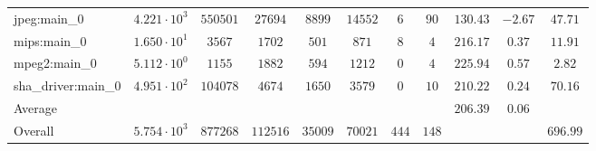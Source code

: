 \begin{tabular}{|l|c|c|c|c|c|c|c|c|c|c|}
jpeg:main\_0            & $ 4.221 \cdot 10^{3}  $ & $ 550501 $ & $ 27694  $ & $ 8899  $ & $ 14552 $ & $ 6   $ & $ 90  $ & $ 130.43      $ & $ -2.67   $ & $ 47.71   $ \\
mips:main\_0            & $ 1.650 \cdot 10^{1}  $ & $ 3567   $ & $ 1702   $ & $ 501   $ & $ 871   $ & $ 8   $ & $ 4   $ & $ 216.17      $ & $ 0.37    $ & $ 11.91   $ \\
mpeg2:main\_0           & $ 5.112 \cdot 10^{0}  $ & $ 1155   $ & $ 1882   $ & $ 594   $ & $ 1212  $ & $ 0   $ & $ 4   $ & $ 225.94      $ & $ 0.57    $ & $ 2.82    $ \\
sha\_driver:main\_0     & $ 4.951 \cdot 10^{2}  $ & $ 104078 $ & $ 4674   $ & $ 1650  $ & $ 3579  $ & $ 0   $ & $ 10  $ & $ 210.22      $ & $ 0.24    $ & $ 70.16   $ \\
\hline
Average                 & $                     $ & $        $ & $        $ & $       $ & $       $ & $     $ & $     $ & $ 206.39      $ & $ 0.06    $ & $         $ \\
\hline
Overall                 & $ 5.754 \cdot 10^{3}  $ & $ 877268 $ & $ 112516 $ & $ 35009 $ & $ 70021 $ & $ 444 $ & $ 148 $ & $             $ & $         $ & $ 696.99  $ \\
\hline
\end{tabular}
